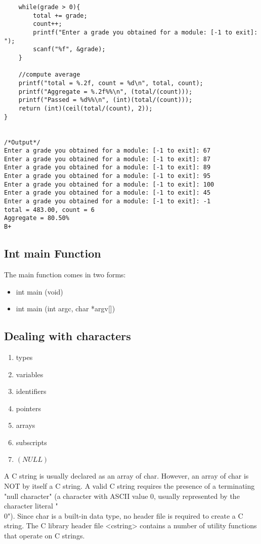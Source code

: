 \documentclass[10pt, a4paper, twocolumn]{article} %
\begin{document}
\begin{lstlisting}
    while(grade > 0){
        total += grade;
        count++;
        printf("Enter a grade you obtained for a module: [-1 to exit]: ");
        scanf("%f", &grade);
    }

    //compute average
    printf("total = %.2f, count = %d\n", total, count);
    printf("Aggregate = %.2f%%\n", (total/(count)));
    printf("Passed = %d%%\n", (int)(total/(count)));
    return (int)(ceil(total/(count), 2));
}


/*Output*/
Enter a grade you obtained for a module: [-1 to exit]: 67
Enter a grade you obtained for a module: [-1 to exit]: 87
Enter a grade you obtained for a module: [-1 to exit]: 89
Enter a grade you obtained for a module: [-1 to exit]: 95
Enter a grade you obtained for a module: [-1 to exit]: 100
Enter a grade you obtained for a module: [-1 to exit]: 45
Enter a grade you obtained for a module: [-1 to exit]: -1
total = 483.00, count = 6
Aggregate = 80.50%
B+
\end{lstlisting}

\subsection{Int main Function}

The main function comes in two forms:

\begin{itemize}
	\item int main (void)
	\item int main (int argc, char *argv[])
\end{itemize}

\subsection{Dealing with characters}

\begin{enumerate}
	\item types
	\item variables
	\item identifiers
	\item pointers
	\item arrays
	\item subscripts
	\item $(NULL)$
\end{enumerate}

A C string is usually declared as an array of char. However, an array of char is NOT by itself a C string. A valid C string requires the presence of a terminating "null character" (a character with ASCII value 0, usually represented by the character literal "\\0").
\newline
\newline
Since char is a built-in data type, no header file is required to create a C string. The C library header file <cstring> contains a number of utility functions that operate on C strings.
\end{document}
